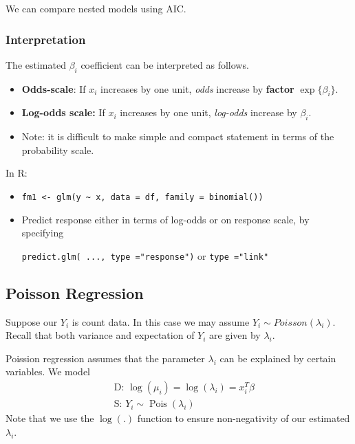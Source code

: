 \documentclass[11pt, %
	oneside, %
	english, %
	onehalfspacing, %
	]{article} %
\numberwithin{equation}{section}
\begin{document}
We can compare nested models using AIC.

\subsubsection*{Interpretation}

The estimated $\beta_i$ coefficient can be interpreted as follows.

\begin{itemize}
    \item \textbf{Odds-scale}: If $x_i$ increases by one unit, \emph{odds} increase by \textbf{factor} $\exp\{\beta_i\}$.
    \item \textbf{Log-odds scale:} If $x_i$ increases by one unit, \emph{log-odds} increase by $\beta_i$.
    \item Note: it is difficult to make simple and compact statement in terms of the probability scale.
\end{itemize}



In R:

\begin{itemize}
    \item \lstinline|fm1 <- glm(y ~ x, data = df, family = binomial())|
    \item Predict response either in terms of log-odds or on response scale, by specifying

    \lstinline|predict.glm( ..., type ="response")| or \lstinline|type ="link"|
\end{itemize}



\subsection{Poisson Regression}

Suppose our $Y_i$ is count data. In this case we may assume $Y_i \sim Poisson(\lambda_i)$. Recall that both variance and expectation of $Y_i$ are given by $\lambda_i$.

Poission regression assumes that the parameter $\lambda_i$ can be explained by certain variables. We model
\begin{equation*}
    \begin{aligned}
        & \text { D: } \log \left(\mu_i\right)=\log \left(\lambda_i\right)=x_i^T \beta \\
        & \text { S: } Y_i \sim \operatorname{Pois}\left(\lambda_i\right)
    \end{aligned}
\end{equation*}
Note that we use the $\log(.)$ function to ensure non-negativity of our estimated $\lambda_i$.
\end{document}
